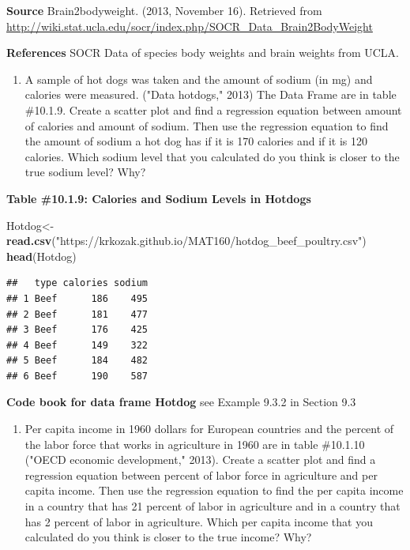 \documentclass[]{book}
\newenvironment{Shaded}{\begin{snugshade}}{\end{snugshade}}
\newcommand{\KeywordTok}[1]{\textcolor[rgb]{0.13,0.29,0.53}{\textbf{#1}}}
\newcommand{\NormalTok}[1]{#1}
\newcommand{\StringTok}[1]{\textcolor[rgb]{0.31,0.60,0.02}{#1}}
\providecommand{\tightlist}{%
  \setlength{\itemsep}{0pt}\setlength{\parskip}{0pt}}
\begin{document}
\textbf{Source}
Brain2bodyweight. (2013, November 16). Retrieved from
\url{http://wiki.stat.ucla.edu/socr/index.php/SOCR_Data_Brain2BodyWeight}

\textbf{References}
SOCR Data of species body weights and brain weights from UCLA.

\begin{enumerate}
\def\labelenumi{\arabic{enumi}.}
\setcounter{enumi}{6}
\tightlist
\item
  A sample of hot dogs was taken and the amount of sodium (in mg) and calories were measured. ("Data hotdogs," 2013) The Data Frame are in table \#10.1.9. Create a scatter plot and find a regression equation between amount of calories and amount of sodium. Then use the regression equation to find the amount of sodium a hot dog has if it is 170 calories and if it is 120 calories. Which sodium level that you calculated do you think is closer to the true sodium level? Why?
\end{enumerate}

\textbf{Table \#10.1.9: Calories and Sodium Levels in Hotdogs}

\begin{Shaded}
\begin{Highlighting}[]
\NormalTok{Hotdog<-}\KeywordTok{read.csv}\NormalTok{(}\StringTok{"https://krkozak.github.io/MAT160/hotdog_beef_poultry.csv"}\NormalTok{)}
\KeywordTok{head}\NormalTok{(Hotdog)}
\end{Highlighting}
\end{Shaded}

\begin{verbatim}
##   type calories sodium
## 1 Beef      186    495
## 2 Beef      181    477
## 3 Beef      176    425
## 4 Beef      149    322
## 5 Beef      184    482
## 6 Beef      190    587
\end{verbatim}

\textbf{Code book for data frame Hotdog} see Example 9.3.2 in Section 9.3

\begin{enumerate}
\def\labelenumi{\arabic{enumi}.}
\setcounter{enumi}{7}
\tightlist
\item
  Per capita income in 1960 dollars for European countries and the percent of the labor force that works in agriculture in 1960 are in table \#10.1.10 ("OECD economic development," 2013). Create a scatter plot and find a regression equation between percent of labor force in agriculture and per capita income. Then use the regression equation to find the per capita income in a country that has 21 percent of labor in agriculture and in a country that has 2 percent of labor in agriculture. Which per capita income that you calculated do you think is closer to the true income? Why?
\end{enumerate}
\end{document}
